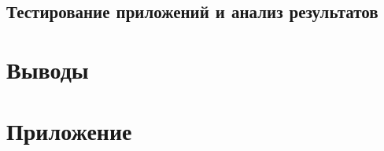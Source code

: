 
\subsection{Тестирование приложений и анализ результатов}


\section{Выводы}


\newpage

\section*{Приложение}



